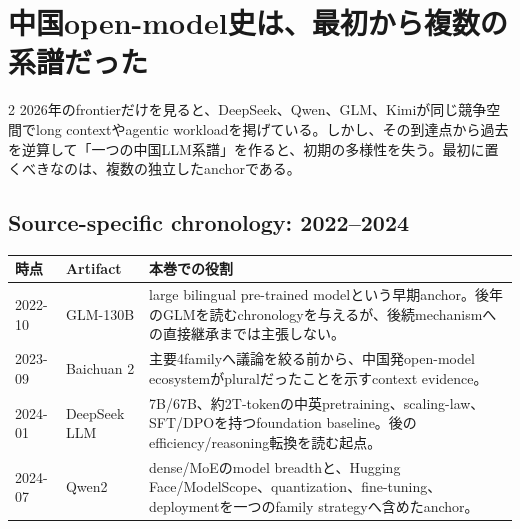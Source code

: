 \documentclass[lualatex,a4paper,10pt]{jlreq}
\begin{document}
\setcounter{tocdepth}{2}
\tableofcontents
\clearpage

\section{中国open-model史は、最初から複数の系譜だった}
\label{sec:plural}

\begin{multicols}{2}
\raggedcolumns
2026年のfrontierだけを見ると、DeepSeek、Qwen、GLM、Kimiが同じ競争空間でlong contextやagentic workloadを掲げている。しかし、その到達点から過去を逆算して「一つの中国LLM系譜」を作ると、初期の多様性を失う。最初に置くべきなのは、複数の独立したanchorである。

\end{multicols}

\subsection{Source-specific chronology: 2022--2024}
\begin{center}
\small
\begin{tabularx}{\textwidth}{@{}p{}p{}X@{}}
\toprule
時点 & Artifact & 本巻での役割 \\
\midrule
2022-10 & GLM-130B & large bilingual pre-trained modelという早期anchor。後年のGLMを読むchronologyを与えるが、後続mechanismへの直接継承までは主張しない。 \\
2023-09 & Baichuan 2 & 主要4familyへ議論を絞る前から、中国発open-model ecosystemがpluralだったことを示すcontext evidence。 \\
2024-01 & DeepSeek LLM & 7B/67B、約2T-tokenの中英pretraining、scaling-law、SFT/DPOを持つfoundation baseline。後のefficiency/reasoning転換を読む起点。 \\
2024-07 & Qwen2 & dense/MoEのmodel breadthと、Hugging Face/ModelScope、quantization、fine-tuning、deploymentを一つのfamily strategyへ含めたanchor。 \\
\bottomrule
\end{tabularx}
\end{center}
\autocite{glm130b,baichuan2,deepseekllm,qwen2}
\end{document}
